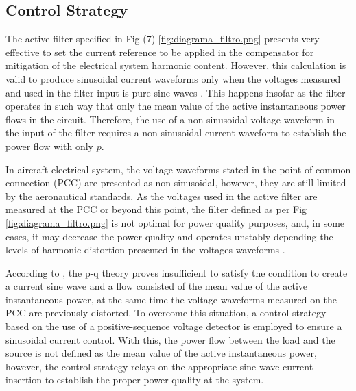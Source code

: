 
\subsection{Control Strategy}

The active filter specified in Fig (7) \ref{fig:diagrama_filtro.png} presents very effective to set the current reference to be applied in the compensator for mitigation of the electrical system harmonic content. However, this calculation is valid to produce sinusoidal current waveforms only when the voltages measured and used in the filter input is pure sine waves \cite{Akagi2007}. This happens insofar as the filter operates in such way that only the mean value of the active instantaneous power flows in the circuit. Therefore, the use of a non-sinusoidal voltage waveform in the input of the filter requires a non-sinusoidal current waveform to establish the power flow with only $\overline{p}$.

In aircraft electrical system, the voltage waveforms stated in the point of common connection (PCC) are presented as non-sinusoidal, however, they are still limited by the aeronautical standards. As the voltages used in the active filter are measured at the PCC or beyond this point, the filter defined as per Fig \ref{fig:diagrama_filtro.png} is not optimal for power quality purposes, and, in some cases, it may decrease the power quality and operates unstably depending the levels of harmonic distortion presented in the voltages waveforms \cite{Akagi2007}.

According to \cite{Akagi2007}, the p-q theory proves insufficient to satisfy the condition to create a current sine wave and a flow consisted of the mean value of the active instantaneous power, at the same time the voltage waveforms measured on the PCC are previously distorted. To overcome this situation, a control strategy based on the use of a positive-sequence voltage detector is employed to ensure a sinusoidal current control. With this, the power flow between the load and the source is not defined as the mean value of the active instantaneous power, however, the control strategy relays on the appropriate sine wave current insertion to establish the proper power quality at the system.


